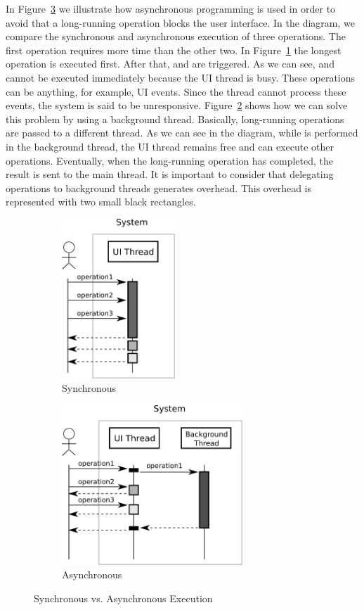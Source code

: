 \documentclass[type=bsc,accentcolor=tud9c]{tudthesis}
\begin{document}
In Figure~\ref{fig:sync-vs-async} we illustrate how asynchronous programming is used in order to avoid that a long-running operation blocks the user interface. In the diagram, we compare the synchronous and asynchronous execution of three operations. The first operation requires more time than the other two. In Figure~\ref{fig:sync} the longest operation is executed first. After that,  and  are triggered. As we can see,  and  cannot be executed immediately because the UI thread is busy. These operations can be anything, for example, UI events. Since the thread cannot process these events, the system is said to be unresponsive. Figure~\ref{fig:async} shows how we can solve this problem by using a background thread. Basically, long-running operations are passed to a different thread. As we can see in the diagram, while  is performed in the background thread, the UI thread remains free and can execute other operations. Eventually, when the long-running operation has completed, the result is sent to the main thread. It is important to consider that delegating operations to background threads generates overhead. This overhead is represented with two small black rectangles.

\begin{figure}[h]
\begin{center}
\begin{subfigure}{0.4\textwidth}
\includegraphics[height=6cm]{asynchrony/sync.png}
\caption{Synchronous}
\label{fig:sync}
\end{subfigure}
\begin{subfigure}{0.4\textwidth}
\includegraphics[height=6cm]{asynchrony/async.png}
\caption{Asynchronous}
\label{fig:async}
\end{subfigure}
\end{center}
\caption{Synchronous vs. Asynchronous Execution}
\label{fig:sync-vs-async}
\end{figure}
\end{document}
